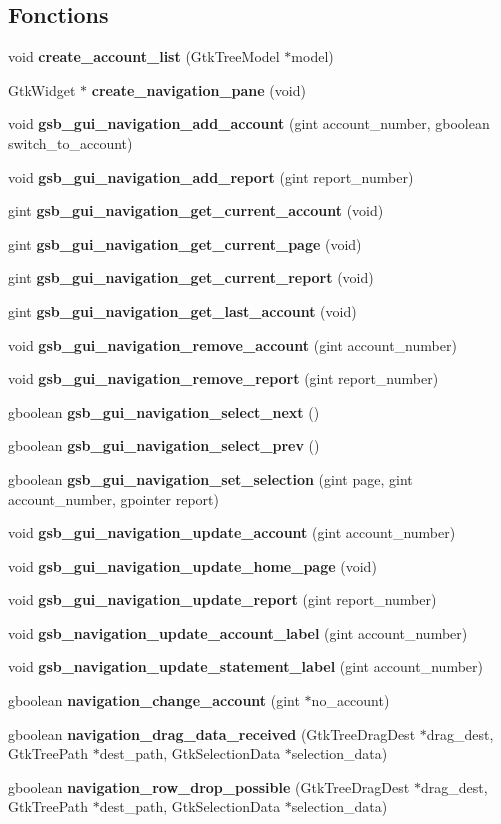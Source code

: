 \subsection*{Fonctions}
\begin{DoxyCompactItemize}
\item 
void {\bf create\_\-account\_\-list} (GtkTreeModel $\ast$model)
\item 
GtkWidget $\ast$ {\bf create\_\-navigation\_\-pane} (void)
\item 
void {\bf gsb\_\-gui\_\-navigation\_\-add\_\-account} (gint account\_\-number, gboolean switch\_\-to\_\-account)
\item 
void {\bf gsb\_\-gui\_\-navigation\_\-add\_\-report} (gint report\_\-number)
\item 
gint {\bf gsb\_\-gui\_\-navigation\_\-get\_\-current\_\-account} (void)
\item 
gint {\bf gsb\_\-gui\_\-navigation\_\-get\_\-current\_\-page} (void)
\item 
gint {\bf gsb\_\-gui\_\-navigation\_\-get\_\-current\_\-report} (void)
\item 
gint {\bf gsb\_\-gui\_\-navigation\_\-get\_\-last\_\-account} (void)
\item 
void {\bf gsb\_\-gui\_\-navigation\_\-remove\_\-account} (gint account\_\-number)
\item 
void {\bf gsb\_\-gui\_\-navigation\_\-remove\_\-report} (gint report\_\-number)
\item 
gboolean {\bf gsb\_\-gui\_\-navigation\_\-select\_\-next} ()
\item 
gboolean {\bf gsb\_\-gui\_\-navigation\_\-select\_\-prev} ()
\item 
gboolean {\bf gsb\_\-gui\_\-navigation\_\-set\_\-selection} (gint page, gint account\_\-number, gpointer report)
\item 
void {\bf gsb\_\-gui\_\-navigation\_\-update\_\-account} (gint account\_\-number)
\item 
void {\bf gsb\_\-gui\_\-navigation\_\-update\_\-home\_\-page} (void)
\item 
void {\bf gsb\_\-gui\_\-navigation\_\-update\_\-report} (gint report\_\-number)
\item 
void {\bf gsb\_\-navigation\_\-update\_\-account\_\-label} (gint account\_\-number)
\item 
void {\bf gsb\_\-navigation\_\-update\_\-statement\_\-label} (gint account\_\-number)
\item 
gboolean {\bf navigation\_\-change\_\-account} (gint $\ast$no\_\-account)
\item 
gboolean {\bf navigation\_\-drag\_\-data\_\-received} (GtkTreeDragDest $\ast$drag\_\-dest, GtkTreePath $\ast$dest\_\-path, GtkSelectionData $\ast$selection\_\-data)
\item 
gboolean {\bf navigation\_\-row\_\-drop\_\-possible} (GtkTreeDragDest $\ast$drag\_\-dest, GtkTreePath $\ast$dest\_\-path, GtkSelectionData $\ast$selection\_\-data)
\end{DoxyCompactItemize}



